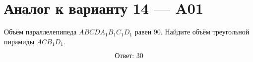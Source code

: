 \documentclass[12pt,a4paper]{article}
\begin{document}
\section*{Аналог к варианту 14 — A01}

Объём параллелепипеда \(ABCDA_1B_1C_1D_1\) равен \(90\). Найдите объём треугольной пирамиды \(ACB_1D_1\).

\begin{center}
\end{center}

\[
\boxed{\text{Ответ: }30}
\]
\end{document}
